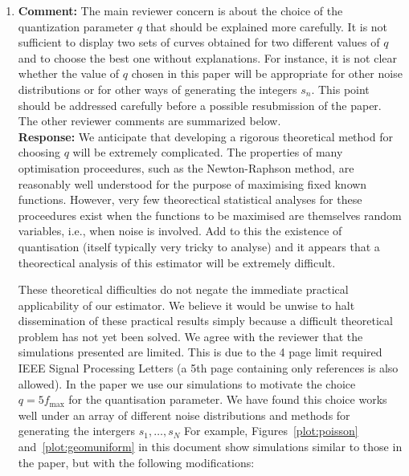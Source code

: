 \documentclass[a4paper,10pt]{article}
\begin{document}
\begin{enumerate}
\item\textbf{Comment:}
The main reviewer concern is about the choice of the quantization parameter
$q$ that should be explained more carefully. It is not sufficient to display two sets
of curves obtained for two different values of $q$ and to choose the best one without
explanations. For instance, it is not clear whether the value of $q$ chosen in this paper
will be appropriate for other noise distributions or for other ways of generating the
integers $s_n$. This point should be addressed carefully before a possible resubmission
of the paper. The other reviewer comments are summarized below.
\\
\textbf{Response:}
We anticipate that developing a rigorous theoretical method for choosing $q$ will be extremely complicated.  The properties of many optimisation proceedures, such as the Newton-Raphson method, are reasonably well understood for the purpose of maximising fixed known functions. However, very few theorectical statistical analyses for these proceedures exist when the functions to be maximised are themselves random variables, i.e., when noise is involved.  Add to this the existence of quantisation (itself typically very tricky to analyse) and it appears that a theorectical analysis of this estimator will be extremely difficult.

These theoretical difficulties do not negate the immediate practical applicability of our estimator.  We believe it would be unwise to halt dissemination of these practical results simply because a difficult theoretical problem has not yet been solved.  We agree with the reviewer that the simulations presented are limited. This is due to the 4 page limit required IEEE Signal Processing Letters (a 5th page containing only references is also allowed).  In the paper we use our simulations to motivate the choice $q = 5 f_{\text{max}}$ for the quantisation parameter.  We have found this choice works well under an array of different noise distributions and methods for generating the intergers $s_1,\dots,s_N$  For example, Figures~\ref{plot:poisson} and~\ref{plot:geomuniform} in this document show simulations similar to those in the paper, but with the following modifications:


\end{enumerate}
\end{document}
